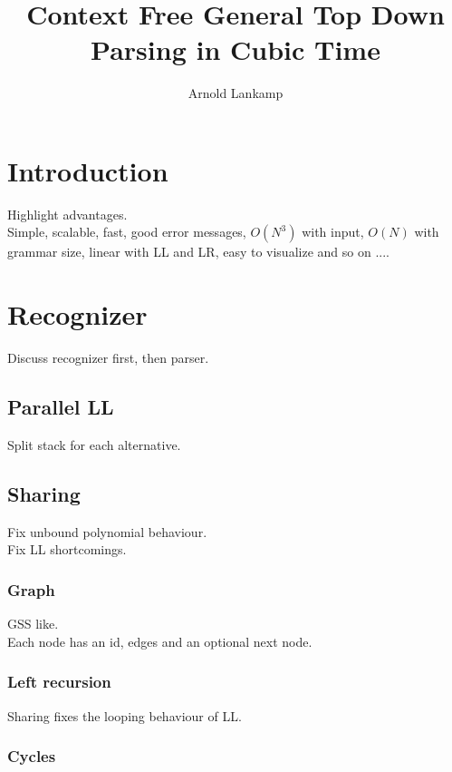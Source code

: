 \documentclass[a4paper,10pt]{article}
\title{Context Free General Top Down Parsing in Cubic Time}
\author{Arnold Lankamp}
\begin{document}
\maketitle

\begin{abstract}

\end{abstract}

\section{Introduction}

Highlight advantages.\\
Simple, scalable, fast, good error messages, $O(N^3)$ with input, $O(N)$ with grammar size, linear with LL and LR, easy to visualize and so on ....

\section{Recognizer}

Discuss recognizer first, then parser.

\subsection{Parallel LL}

Split stack for each alternative.

\subsection{Sharing}

Fix unbound polynomial behaviour.\\
Fix LL shortcomings.

\subsubsection{Graph}

GSS like.\\
Each node has an id, edges and an optional next node.

\subsubsection{Left recursion}

Sharing fixes the looping behaviour of LL.

\subsubsection{Cycles}
\end{document}
